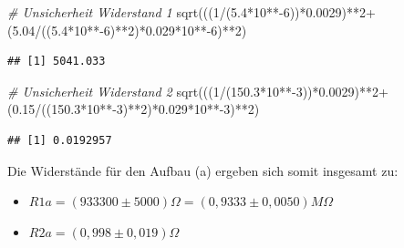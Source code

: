 \documentclass[
  9pt,
]{article}
\newenvironment{Shaded}{\begin{snugshade}}{\end{snugshade}}
\newcommand{\CommentTok}[1]{\textcolor[rgb]{0.56,0.35,0.01}{\textit{#1}}}
\newcommand{\DecValTok}[1]{\textcolor[rgb]{0.00,0.00,0.81}{#1}}
\newcommand{\FloatTok}[1]{\textcolor[rgb]{0.00,0.00,0.81}{#1}}
\newcommand{\FunctionTok}[1]{\textcolor[rgb]{0.00,0.00,0.00}{#1}}
\newcommand{\NormalTok}[1]{#1}
\newcommand{\SpecialCharTok}[1]{\textcolor[rgb]{0.00,0.00,0.00}{#1}}
\begin{document}
\begin{Shaded}
\begin{Highlighting}[]
\CommentTok{\# Unsicherheit Widerstand 1}
\FunctionTok{sqrt}\NormalTok{(((}\DecValTok{1}\SpecialCharTok{/}\NormalTok{(}\FloatTok{5.4}\SpecialCharTok{*}\DecValTok{10}\SpecialCharTok{**{-}}\DecValTok{6}\NormalTok{))}\SpecialCharTok{*}\FloatTok{0.0029}\NormalTok{)}\SpecialCharTok{**}\DecValTok{2}\SpecialCharTok{+}\NormalTok{(}\FloatTok{5.04}\SpecialCharTok{/}\NormalTok{((}\FloatTok{5.4}\SpecialCharTok{*}\DecValTok{10}\SpecialCharTok{**{-}}\DecValTok{6}\NormalTok{)}\SpecialCharTok{**}\DecValTok{2}\NormalTok{)}\SpecialCharTok{*}\FloatTok{0.029}\SpecialCharTok{*}\DecValTok{10}\SpecialCharTok{**{-}}\DecValTok{6}\NormalTok{)}\SpecialCharTok{**}\DecValTok{2}\NormalTok{)}
\end{Highlighting}
\end{Shaded}

\begin{verbatim}
## [1] 5041.033
\end{verbatim}

\begin{Shaded}
\begin{Highlighting}[]
\CommentTok{\# Unsicherheit Widerstand 2}
\FunctionTok{sqrt}\NormalTok{(((}\DecValTok{1}\SpecialCharTok{/}\NormalTok{(}\FloatTok{150.3}\SpecialCharTok{*}\DecValTok{10}\SpecialCharTok{**{-}}\DecValTok{3}\NormalTok{))}\SpecialCharTok{*}\FloatTok{0.0029}\NormalTok{)}\SpecialCharTok{**}\DecValTok{2}\SpecialCharTok{+}\NormalTok{(}\FloatTok{0.15}\SpecialCharTok{/}\NormalTok{((}\FloatTok{150.3}\SpecialCharTok{*}\DecValTok{10}\SpecialCharTok{**{-}}\DecValTok{3}\NormalTok{)}\SpecialCharTok{**}\DecValTok{2}\NormalTok{)}\SpecialCharTok{*}\FloatTok{0.029}\SpecialCharTok{*}\DecValTok{10}\SpecialCharTok{**{-}}\DecValTok{3}\NormalTok{)}\SpecialCharTok{**}\DecValTok{2}\NormalTok{)}
\end{Highlighting}
\end{Shaded}

\begin{verbatim}
## [1] 0.0192957
\end{verbatim}

Die Widerstände für den Aufbau (a) ergeben sich somit insgesamt zu:

\begin{itemize}
\item $R1a = (933300 \pm 5000)\Omega = (0,9333 \pm 0,0050)M\Omega$
\item $R2a = (0,998 \pm 0,019) \Omega$
\end{itemize}
\end{document}
